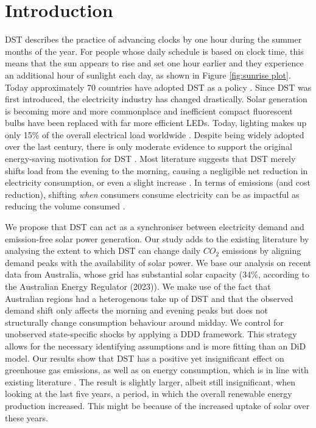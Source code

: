 
\section{Introduction}
\ac{DST} describes the practice of advancing clocks by one hour during the summer months of the year. For people whose daily schedule is based on clock time, this means that the sun appears to rise and set one hour earlier and they experience an additional hour of sunlight each day, as shown in Figure \ref{fig:sunrise plot}. Today approximately 70 countries have adopted \ac{DST} as a policy \parencite{prerau_book}. Since \ac{DST} was first introduced, the electricity industry has changed drastically. Solar generation is becoming more and more commonplace and inefficient compact fluorescent bulbs have been replaced with far more efficient LEDs. Today, lighting makes up only 15\% of the overall electrical load worldwide \parencite{ec_lighting}. 
Despite being widely adopted over the last century, there is only moderate evidence to support the original energy-saving motivation for \ac{DST} \parencite{prerau_book}. Most literature suggests that \ac{DST} merely shifts load from the evening to the morning, causing a negligible net reduction in electricity consumption, or even a slight increase \parencite{kellogg_daylight_2008, aries_effect_2008, guven}.
In terms of emissions (and cost reduction), shifting \textit{when} consumers consume electricity can be as impactful as reducing the volume consumed \parencite{holland_is_2008}.

We propose that \ac{DST} can act as a synchroniser between electricity demand and emission-free solar power generation. Our study adds to the existing literature by analysing the extent to which DST can change daily $CO_2$ emissions by aligning demand peaks with the availability of solar power. We base our analysis on recent data from Australia, whose grid has substantial solar capacity (34\%, according to the Australian Energy Regulator (2023)\nocite{state_of_the_market}). We make use of the fact that Australian regions had a heterogenous take up of \ac{DST} and that the observed demand shift only affects the morning and evening peaks but does not structurally change consumption behaviour around midday. We control for unobserved state-specific shocks by applying a \ac{DDD} framework. This strategy allows for the necessary identifying assumptions and is more fitting than an \ac{DiD} model. Our results show that \ac{DST} has a positive yet insignificant effect on greenhouse gas emissions, as well as on energy consumption, which is in line with existing literature \parencite{kellogg_daylight_2008}. The result is slightly larger, albeit still insignificant, when looking at the last five years, a period, in which the overall renewable energy production increased. This might be because of the increased uptake of solar over these years.